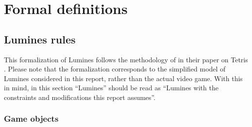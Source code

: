 \section{Formal definitions}
\subsection{Lumines rules}
\label{sub:formal}

This formalization of Lumines follows the methodology of \citeauthor{tetris} in their paper on Tetris \cite{tetris}. Please note that the formalization corresponds to the simplified model of Lumines considered in this report, rather than the actual video game. With this in mind, in this section ``Lumines'' should be read as ``Lumines with the constraints and modifications this report assumes''.

\subsubsection{Game objects}

